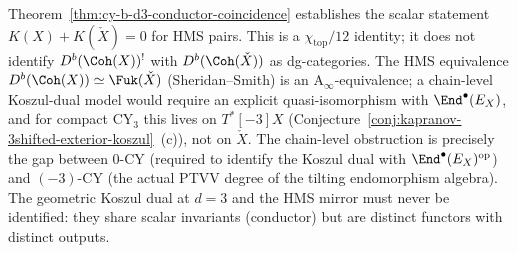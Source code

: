 \begin{remark}
\label{rem:conductor-coincidence-not-koszul}
Theorem~\ref{thm:cy-b-d3-conductor-coincidence} establishes the scalar statement $K(X)+K(\check X)=0$ for HMS pairs. This is a $\chi_{\mathrm{top}}/12$ identity; it does not identify $D^b(\Coh(X))^!$ with $D^b(\Coh(\check X))$ as dg-categories. The HMS equivalence $D^b(\Coh(X))\simeq \Fuk(\check X)$ (Sheridan--Smith) is an A$_{\infty}$-equivalence; a chain-level Koszul-dual model would require an explicit quasi-isomorphism with $\End^\bullet(E_X)$, and for compact CY$_3$ this lives on $T^*[-3]X$ (Conjecture~\ref{conj:kapranov-3shifted-exterior-koszul}~(c)), not on $\check X$. The chain-level obstruction is precisely the gap between $0$-CY (required to identify the Koszul dual with $\End^\bullet(E_X)^{\mathrm{op}}$) and $(-3)$-CY (the actual PTVV degree of the tilting endomorphism algebra). The geometric Koszul dual at $d=3$ and the HMS mirror must never be identified: they share scalar invariants (conductor) but are distinct functors with distinct outputs.
\end{remark}

